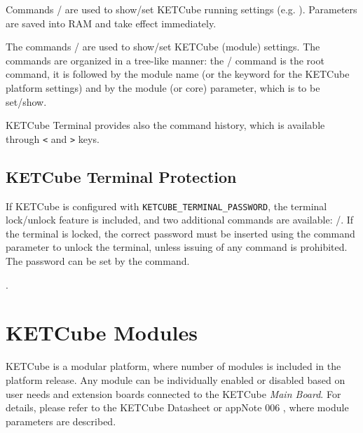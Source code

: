 Commands / are used to show/set KETCube running settings (e.g. ). Parameters are saved into RAM and take effect immediately.

The commands / are used to show/set KETCube (module) settings. The commands are organized in a tree-like manner: the / command is the root command, it is followed by the module name (or the keyword  for the KETCube platform settings) and by the module (or core) parameter, which is to be set/show. 

KETCube Terminal provides also the command history, which is available through {\tt <} and {\tt >} keys.


\clearpage

\subsection{KETCube Terminal Protection}

If KETCube is configured with \texttt{KETCUBE\_TERMINAL\_PASSWORD}, the terminal lock/unlock feature is included, and two additional commands are available: /. If the terminal is locked, the correct password must be inserted using the  command parameter to unlock the terminal, unless issuing of any command is prohibited. The password can be set by the  command.

.


\clearpage
\section{KETCube Modules}\label{sec:modules}
KETCube is a modular platform, where number of modules is included in the platform release. Any module can be individually enabled or disabled based on user needs and extension boards connected to the KETCube {\it Main Board}. For details, please refer to the KETCube Datasheet \cite{ZCU:KETCube:05-2018} or appNote 006 \cite{ZCU:KETCubeAppNote006:09-2019}, where module parameters are described.

